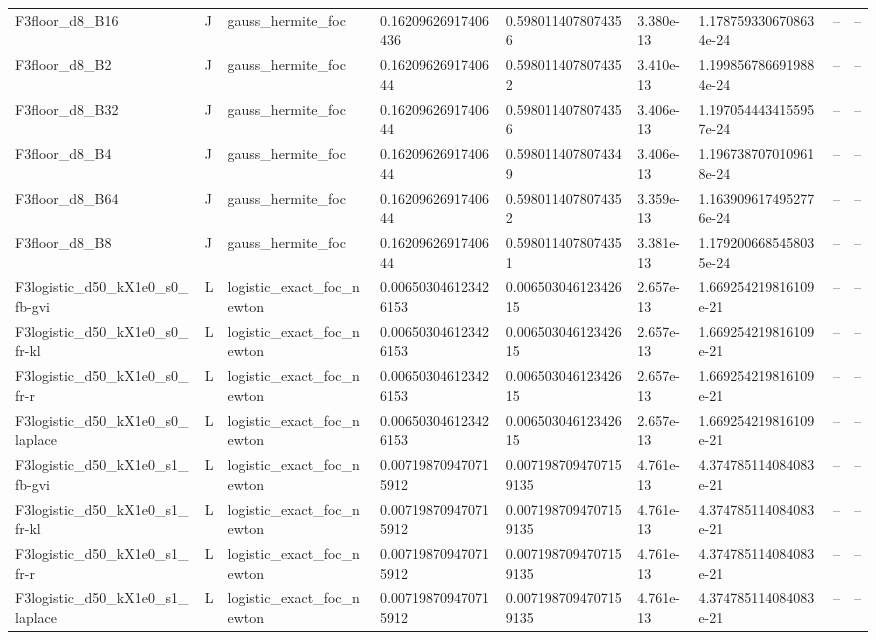 \begin{tabular}{lllllllll}
F3floor\_d8\_B16 & J & gauss\_hermite\_foc & 0.16209626917406436 & 0.5980114078074356 & 3.380e-13 & 1.1787593306708634e-24 & -- & -- \\
F3floor\_d8\_B2 & J & gauss\_hermite\_foc & 0.1620962691740644 & 0.5980114078074352 & 3.410e-13 & 1.1998567866919884e-24 & -- & -- \\
F3floor\_d8\_B32 & J & gauss\_hermite\_foc & 0.1620962691740644 & 0.5980114078074356 & 3.406e-13 & 1.1970544434155957e-24 & -- & -- \\
F3floor\_d8\_B4 & J & gauss\_hermite\_foc & 0.1620962691740644 & 0.5980114078074349 & 3.406e-13 & 1.1967387070109618e-24 & -- & -- \\
F3floor\_d8\_B64 & J & gauss\_hermite\_foc & 0.1620962691740644 & 0.5980114078074352 & 3.359e-13 & 1.1639096174952776e-24 & -- & -- \\
F3floor\_d8\_B8 & J & gauss\_hermite\_foc & 0.1620962691740644 & 0.5980114078074351 & 3.381e-13 & 1.1792006685458035e-24 & -- & -- \\
F3logistic\_d50\_kX1e0\_s0\_fb-gvi & L & logistic\_exact\_foc\_newton & 0.006503046123426153 & 0.00650304612342615 & 2.657e-13 & 1.669254219816109e-21 & -- & -- \\
F3logistic\_d50\_kX1e0\_s0\_fr-kl & L & logistic\_exact\_foc\_newton & 0.006503046123426153 & 0.00650304612342615 & 2.657e-13 & 1.669254219816109e-21 & -- & -- \\
F3logistic\_d50\_kX1e0\_s0\_fr-r & L & logistic\_exact\_foc\_newton & 0.006503046123426153 & 0.00650304612342615 & 2.657e-13 & 1.669254219816109e-21 & -- & -- \\
F3logistic\_d50\_kX1e0\_s0\_laplace & L & logistic\_exact\_foc\_newton & 0.006503046123426153 & 0.00650304612342615 & 2.657e-13 & 1.669254219816109e-21 & -- & -- \\
F3logistic\_d50\_kX1e0\_s1\_fb-gvi & L & logistic\_exact\_foc\_newton & 0.007198709470715912 & 0.0071987094707159135 & 4.761e-13 & 4.374785114084083e-21 & -- & -- \\
F3logistic\_d50\_kX1e0\_s1\_fr-kl & L & logistic\_exact\_foc\_newton & 0.007198709470715912 & 0.0071987094707159135 & 4.761e-13 & 4.374785114084083e-21 & -- & -- \\
F3logistic\_d50\_kX1e0\_s1\_fr-r & L & logistic\_exact\_foc\_newton & 0.007198709470715912 & 0.0071987094707159135 & 4.761e-13 & 4.374785114084083e-21 & -- & -- \\
F3logistic\_d50\_kX1e0\_s1\_laplace & L & logistic\_exact\_foc\_newton & 0.007198709470715912 & 0.0071987094707159135 & 4.761e-13 & 4.374785114084083e-21 & -- & -- \\

\end{tabular}
